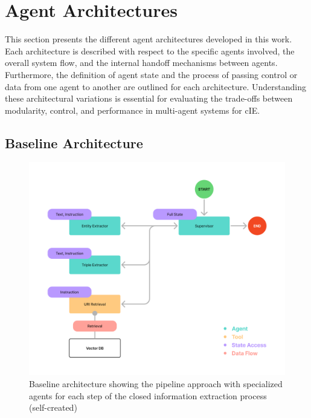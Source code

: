 \documentclass[a4paper,oneside,bibliography=totoc]{scrbook}
\begin{document}
\section{Agent Architectures}
\label{sec:agent_architectures}

This section presents the different agent architectures developed in this work. Each architecture is described with respect to the specific agents involved, the overall system flow, and the internal handoff mechanisms between agents. Furthermore, the definition of agent state and the process of passing control or data from one agent to another are outlined for each architecture. Understanding these architectural variations is essential for evaluating the trade-offs between modularity, control, and performance in multi-agent systems for \ac{cIE}.

\subsection{Baseline Architecture}
\label{subsec:baseline}

\begin{figure}[h]
  \centering
  \includegraphics[width=\textwidth]{figures/Baseline Architecture.png}
  \caption[Baseline architecture showing the pipeline approach with specialized agents for each step of the closed information extraction process]{Baseline architecture showing the pipeline approach with specialized agents for each step of the closed information extraction process (self-created)}
  \label{fig:baseline_architecture}
\end{figure}
\end{document}
